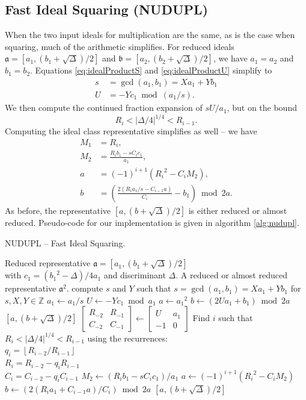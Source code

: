 \documentclass{ucalgthes1}
\theoremstyle{plain}
\theoremstyle{definition}
\newcommand{\ZZ}{\mathbb{Z}}
\newcommand{\matrixtt}[4]{\left[ \begin{array}{rr} #1 & #2 \\ #3 & #4 \end{array} \right]}
\newcommand{\floor}[1]{\left\lfloor #1 \right\rfloor}
\begin{document}
\subsection{Fast Ideal Squaring (NUDUPL)}
\label{subsec:nudupl}

When the two input ideals for multiplication are the same, as is the case when squaring, much of the arithmetic simplifies.  For reduced ideals $\mathfrak a = [a_1, (b_1 + \sqrt\Delta)/2]$ and $\mathfrak b = [a_2, (b_2 + \sqrt\Delta)/2]$, we have $a_1=a_2$ and $b_1=b_2$.  Equations \ref{eq:idealProductS} and \ref{eq:idealProductU} simplify to
\begin{align*}
	s &= \gcd(a_1, b_1) = Xa_1 + Yb_1 \\
	U &= -Yc_1 \bmod (a_1/s).
\end{align*}
We then compute the continued fraction expansion of $sU/a_1$, but on the bound
\[
	R_i < |\Delta/4|^{1/4} < R_{i-1}.
\]
Computing the ideal class representative simplifies as well -- we have
\begin{align*}
	M_1 &= R_i, \\
	M_2 &= \frac{R_i b_1 - sC_i c_1}{a_1}, \\
	a &= (-1)^{i+1}({R_i}^2 - C_i M_2), \\
	b &= \left(\frac{2(R_i a_1/s  - C_{i-1} a)}{C_i} - b_1 \right) \bmod{2a}.
\end{align*}
As before, the representative $[a, (b+\sqrt\Delta)/2]$ is either reduced or almost reduced.  \break Pseudo-code for our implementation is given in algorithm \ref{alg:nudupl}.

\begin{algorithm}[h]
\caption{NUDUPL -- Fast Ideal Squaring.}
\label{alg:nudupl}
\begin{algorithmic}[1]
\REQUIRE Reduced representative $\mathfrak a = [a_1, (b_1+\sqrt\Delta)/2]$ \\
         with $c_1 = ({b_1}^2-\Delta)/4a_1$ and discriminant $\Delta$.
\ENSURE A reduced or almost reduced representative $\mathfrak a^2$.
\STATE compute $s$ and $Y$ such that $s = \gcd(a_1, b_1) = Xa_1 + Yb_1$ for $s,X,Y \in \ZZ$
\STATE $a_1 \gets a_1/s$
\STATE $U \gets -Yc_1 \bmod a_1$
	\STATE $a \gets {a_1}^2$
	\STATE $b \gets (2Ua_1 + b_1) \bmod 2a$
	\RETURN $[a, (b + \sqrt\Delta)/2]$
\ENDIF
\STATE $\matrixtt{R_{-2}}{R_{-1}}{C_{-2}}{C_{-1}} \gets \matrixtt{U}{a_1}{-1}{0}$
\STATE Find $i$ such that $R_i < |\Delta/4|^{1/4} < R_{i-1}$ using the recurrences: \\
       $q_i = \floor{R_{i-2}/R_{i-1}}$ \\
       $R_i = R_{i-2}-q_i R_{i-1}$ \\
       $C_i=C_{i-2}-q_i C_{i-1}$
\STATE $M_2 \gets (R_i b_1 -sC_i c_1)/a_1$
\STATE $a \gets (-1)^{i+1}({R_i}^2 - C_i M_2)$
\STATE $b \gets (2(R_i a_1 + C_{i-1} a)/C_i) \bmod{2a}$
\RETURN $[a, (b+\sqrt\Delta)/2]$
\end{algorithmic}
\end{algorithm}
\end{document}
